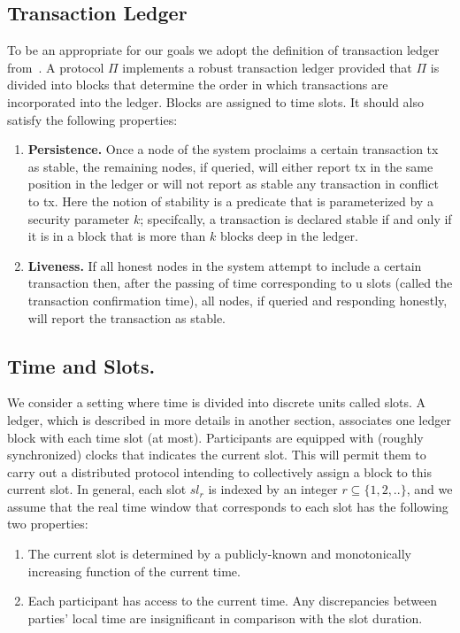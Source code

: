 \subsection{Transaction Ledger}\label{subsec:transaction-ledger}

To be an appropriate for our goals we adopt the definition of transaction ledger from~\cite{cryptoeprint:2016/889}.
A protocol $\Pi$ implements a robust transaction ledger provided that $\Pi$ is divided into blocks that determine the order in which transactions are incorporated into the ledger.
Blocks are assigned to time slots.
It should also satisfy the following properties:
\begin{enumerate}
    \item \textbf{Persistence.} Once a node of the system proclaims a certain transaction tx as stable, the remaining
    nodes, if queried, will either report tx in the same position in the ledger or will not report as stable any transaction in conflict to tx.
    Here the notion of stability is a predicate that is parameterized by a security parameter $k$; specifcally, a transaction is declared stable if and only if it is in a block that is more than $k$ blocks deep in the ledger.
    \item \textbf{Liveness.} If all honest nodes in the system attempt to include a certain transaction then, after the passing of time corresponding to u slots (called the transaction confirmation time), all nodes, if queried and responding honestly, will report the transaction as stable.
\end{enumerate}

\subsection{Time and Slots.}\label{subsec:time-and-slots.}
We consider a setting where time is divided into discrete units called slots.
A ledger, which is described in more details in another section, associates one ledger block with each time slot (at most).
Participants are equipped with (roughly synchronized) clocks that indicates the current slot.
This will permit them to carry out a distributed protocol intending to collectively assign a block to this current
slot.
In general, each slot $sl_r$ is indexed by an integer $r \subseteq \{1, 2, ..\}$, and we assume that the real
time window that corresponds to each slot has the following two properties:
\begin{enumerate}
    \item The current slot is determined by a publicly-known and monotonically increasing function of the current time.
    \item Each participant has access to the current time.
    Any discrepancies between parties' local time are insignificant in comparison with the slot duration.
\end{enumerate}


